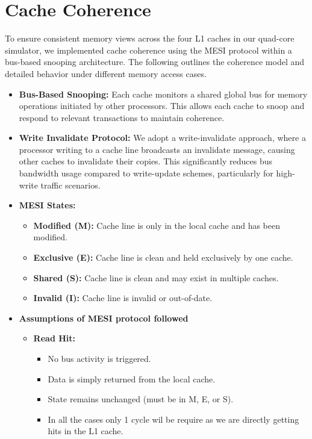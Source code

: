 \documentclass[11pt]{article}
\begin{document}
\section{Cache Coherence}
To ensure consistent memory views across the four L1 caches in our quad-core simulator, we implemented cache coherence using the MESI protocol within a bus-based snooping architecture. The following outlines the coherence model and detailed behavior under different memory access cases.

\begin{itemize}
  \item \textbf{Bus-Based Snooping:} Each cache monitors a shared global bus for memory operations initiated by other processors. This allows each cache to snoop and respond to relevant transactions to maintain coherence.

  \item \textbf{Write Invalidate Protocol:} We adopt a write-invalidate approach, where a processor writing to a cache line broadcasts an invalidate message, causing other caches to invalidate their copies. This significantly reduces bus bandwidth usage compared to write-update schemes, particularly for high-write traffic scenarios.

  \item \textbf{MESI States:}
    \begin{itemize}
      \item \textbf{Modified (M):} Cache line is only in the local cache and has been modified.
      \item \textbf{Exclusive (E):} Cache line is clean and held exclusively by one cache.
      \item \textbf{Shared (S):} Cache line is clean and may exist in multiple caches.
      \item \textbf{Invalid (I):} Cache line is invalid or out-of-date.
    \end{itemize}

  \item \textbf{Assumptions of MESI protocol followed}
    \begin{itemize}
      \item \textbf{Read Hit:}
        \begin{itemize}
          \item No bus activity is triggered.
          \item Data is simply returned from the local cache.
          \item State remains unchanged (must be in M, E, or S).
          \item In all the cases only 1 cycle wil be require as we are directly getting hits in the L1 cache.
        \end{itemize}


\end{itemize}
\end{itemize}
\end{document}
